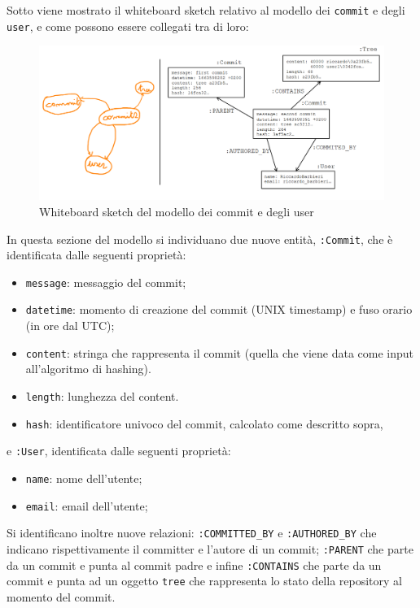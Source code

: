 Sotto viene mostrato il whiteboard sketch relativo al modello dei \texttt{commit} e degli \texttt{user}, e come possono essere collegati tra di loro:
\begin{figure}[H]
    \centering
    \includegraphics[width=15cm]{./immagini/whiteboard_commit.png}
    \caption{Whiteboard sketch del modello dei commit e degli user}
\end{figure}
In questa sezione del modello si individuano due nuove entità, \texttt{:Commit}, che è identificata dalle seguenti proprietà:
\begin{itemize}
    \item \texttt{message}: messaggio del commit;
    \item \texttt{datetime}: momento di creazione del commit (UNIX timestamp) e fuso orario (in ore dal UTC);
    \item \texttt{content}: stringa che rappresenta il commit (quella che viene data come input all'algoritmo di hashing).
    \item \texttt{length}: lunghezza del content.
    \item \texttt{hash}: identificatore univoco del commit, calcolato come descritto sopra,
\end{itemize}
e \texttt{:User}, identificata dalle seguenti proprietà:
\begin{itemize}
    \item \texttt{name}: nome dell'utente;
    \item \texttt{email}: email dell'utente;
\end{itemize}
Si identificano inoltre nuove relazioni: \texttt{:COMMITTED\_BY} e \texttt{:AUTHORED\_BY} che indicano rispettivamente il committer e l'autore di un commit; \texttt{:PARENT} che parte da un commit e punta al commit padre e infine \texttt{:CONTAINS} che parte da un commit e punta ad un oggetto \texttt{tree} che rappresenta lo stato della repository al momento del commit.

